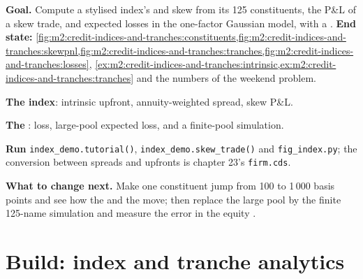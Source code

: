 \begin{tutorial}
\textbf{Goal.} Compute a stylised index's  and skew from its 125
constituents, the P\&L of a skew trade, and  expected losses in the one-factor
Gaussian model, with a .
\textbf{End state:} \cref{fig:m2:credit-indices-and-tranches:constituents,fig:m2:credit-indices-and-tranches:skewpnl,fig:m2:credit-indices-and-tranches:tranches,fig:m2:credit-indices-and-tranches:losses},
\cref{ex:m2:credit-indices-and-tranches:intrinsic,ex:m2:credit-indices-and-tranches:tranches}
and the numbers of the weekend problem.
\begin{tutsteps}
\item \textbf{The index}: intrinsic upfront, annuity-weighted spread, skew P\&L.
\label{lst:m2:credit-indices-and-tranches:index}
\item \textbf{The }:  loss, large-pool expected loss,  and a
finite-pool simulation.
\label{lst:m2:credit-indices-and-tranches:tranche}
\item \textbf{Run} \texttt{index\_demo.tutorial()}, \texttt{index\_demo.skew\_trade()} and
\texttt{fig\_index.py}; the conversion between spreads and upfronts is chapter 23's
\texttt{firm.cds}.
\end{tutsteps}
\textbf{What to change next.} Make one constituent jump from 100 to 1\,000 basis points
and see how the  and the  move; then replace the large pool by
the finite 125-name simulation and measure the error in the equity .
\end{tutorial}

\section{Build: index and tranche analytics}\label{bld:m2:credit-indices-and-tranches:tranche}

